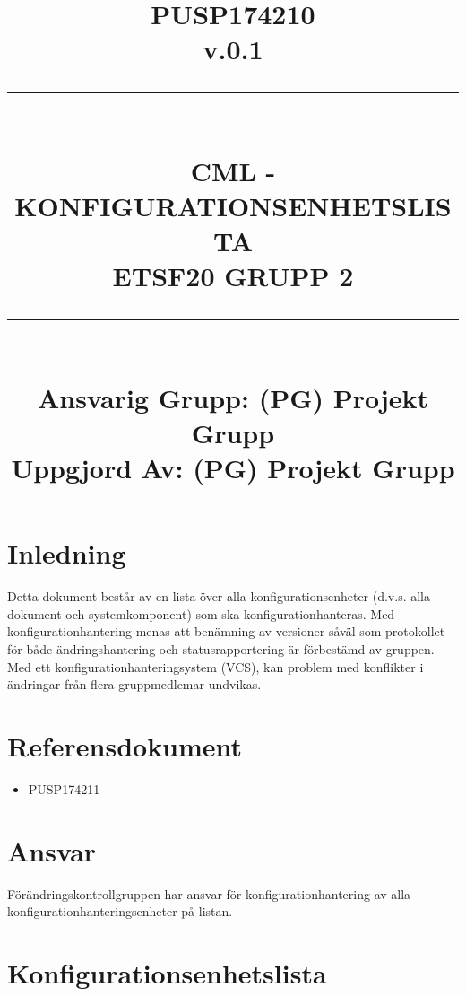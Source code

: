 \documentclass[paper=a4, fontsize=11pt,twoside]{article}
\title{
		\documentNumber{#1}																						
		\documentVersion{#2}																				
		\HRule{0.5pt} \\ %
		\LARGE \textbf{\uppercase{#3}} \\
		\large \textbf{\uppercase{ETSF20 Grupp 2}} 
		\HRule{2pt} \\ [1.5cm]    
		\normalsize            
		\documentResponsible{#4} \\ 
		\documentCreator{#4}  
	}
\newcommand{\HRule}[1]{\rule{\linewidth}{#1}}
\newcommand{\documentNumber}[1]{\centering PUSP1742#1 \\[1.0cm]}
\newcommand{\documentVersion}[1]{\centering \small{v.#1} \\[1.0cm]}
\newcommand{\documentResponsible}[1]{\centering  Ansvarig Grupp: #1}
\newcommand{\documentCreator}[1]{\centering Uppgjord Av: #1}
\newcommand{\grouptitlepage}[4]{ 
	\title{
		\documentNumber{#1}																						
		\documentVersion{#2}																				
		\HRule{0.5pt} \\ %
		\LARGE \textbf{\uppercase{#3}} \\
		\large \textbf{\uppercase{ETSF20 Grupp 2}} 
		\HRule{2pt} \\ [1.5cm]    
		\normalsize            
		\documentResponsible{#4} \\ 
		\documentCreator{#4}  
	}																							
	\maketitle																							
	\thispagestyle{empty} 																					
	\newpage 
}
\begin{document}
\grouptitlepage
{10}  %
{0.1}
{CML - Konfigurationsenhetslista}
{(PG) Projekt Grupp}	
\tableofcontents
\section{Inledning}
Detta dokument består av en lista över alla konfigurationsenheter (d.v.s. alla dokument och systemkomponent) som ska konfigurationhanteras. Med konfigurationhantering menas att benämning av versioner såväl som protokollet för både ändringshantering och statusrapportering är förbestämd av gruppen. Med ett konfigurationhanteringsystem (VCS), kan problem med konflikter i ändringar från flera gruppmedlemar undvikas.

\section{Referensdokument}
\begin{itemize}
\item PUSP174211
\end{itemize}

\section{Ansvar}
Förändringskontrollgruppen har ansvar för konfigurationhantering av alla konfigurationhanteringsenheter på listan.

\section{Konfigurationsenhetslista}
\end{document}
